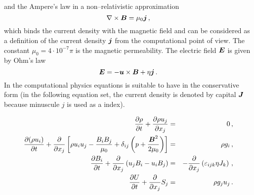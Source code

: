 and the Ampere's law in a non--relativistic approximation
\begin{equation}
 \nabla\times\boldsymbol{B}=\mu_0\boldsymbol{j}\,,
\end{equation}
which binds the current density with the magnetic field and can be considered as a definition of the current density $\boldsymbol{j}$ from the computational point of
view. The constant $\mu_0=4\cdot10^{-7}\pi$ is the magnetic permeability. The electric field $\boldsymbol{E}$ is given by Ohm's law
\begin{equation}
 \boldsymbol{E}=-\boldsymbol{u}\times \boldsymbol{B}+\eta \boldsymbol{j}\,.
\end{equation}
In the computational physics equations is suitable to have in the conservative form (in the following equation set, the current density is denoted by capital 
$\boldsymbol{J}$ because minuscule $j$ is used as a index).

\begin{eqnarray}
\label{eq:mhd}
 \frac{\partial \rho}{\partial t}+\frac{\partial \rho u_j}{\partial x_j} &=& 0 \,,\nonumber\\
 \frac{\partial (\rho u_i)}{\partial t}+\frac{\partial }{\partial x_j}\left[ \rho u_iu_j-\frac{B_iB_j}{\mu_0}+\delta_{ij}\left( p+\frac{\boldsymbol{B}^2}{2\mu_0}\right)\right] &=& \rho g_i \,,\nonumber\\
 \frac{\partial B_i}{\partial t}+\frac{\partial }{\partial x_j}\left( u_jB_i-u_iB_j\right) &=& -\frac{\partial }{\partial x_j}\left(\varepsilon_{ijk}\eta J_k\right) \,,\\
 \frac{\partial U}{\partial t}+\frac{\partial }{\partial x_j}S_j &=& \rho g_ju_j \,.\nonumber
\end{eqnarray}


